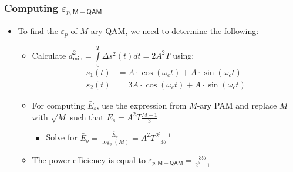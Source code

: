 \documentclass[10pt]{beamer}
\begin{document}
{
  \frametitle{Computing $\varepsilon_{p,\mathsf{M-QAM}}$}

    \begin{itemize}
        \item To find the $\varepsilon_{p}$ of $M$-ary QAM, we need to determine the following:
        \begin{itemize}
            \item Calculate $d_{\min}^2=\int\limits_0^T\Delta{s^2(t)}dt=2A^2T$ using:
            \begin{equation}
            \begin{split}
                s_1(t)&=A\cdot\cos(\omega_ct)+A\cdot\sin(\omega_ct)\\
                s_2(t)&=3A\cdot\cos(\omega_ct)+A\cdot\sin(\omega_ct)\nonumber
            \end{split}
            \end{equation}
            \item For computing $\bar{E}_s$, use the expression from $M$-ary PAM and replace $M$ with $\sqrt{M}$ such that $\bar{E}_s=A^2T\frac{M-1}{3}$
            \begin{itemize}
                \item Solve for $\bar{E}_b=\frac{\bar{E}_s}{\log_2(M)}=A^2T\frac{2^b-1}{3b}$
            \end{itemize}
            \item The power efficiency is equal to $\varepsilon_{p,\mathsf{M-QAM}}=\frac{3!b}{2^b-1}$
        \end{itemize}
    \end{itemize}


}
\end{document}

